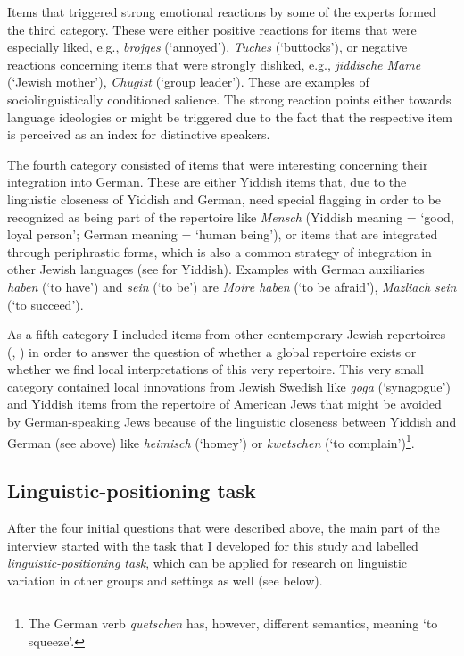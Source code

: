 \documentclass[output=paper]{langscibook}
\begin{document}
\begin{sloppypar}
Items that triggered strong emotional reactions by some of the experts formed the third category. These were either positive reactions for items that were especially liked, e.g., \textit{brojges} (‘annoyed’), \textit{Tuches} (‘buttocks’), or negative reactions concerning items that were strongly disliked, e.g., \textit{jiddische Mame} (‘Jewish mother’), \textit{Chugist} (‘group leader’). These are examples of sociolinguistically conditioned salience. The strong reaction points either towards language ideologies or might be triggered due to the fact that the respective item is perceived as an index for distinctive speakers.
\end{sloppypar}
The fourth category consisted of items that were interesting concerning their integration into German. These are either Yiddish items that, due to the linguistic closeness of Yiddish and German, need special flagging in order to be recognized as being part of the repertoire like \textit{Mensch} (Yiddish meaning = ‘good, loyal person’; German meaning = ‘human being’), or items that are integrated through periphrastic forms, which is also a common strategy of integration in other Jewish languages (see \citealt[210--212]{Jacobs2005} for Yiddish). Examples with German auxiliaries \textit{haben} (‘to have’) and \textit{sein} (‘to be’) are \textit{Moire haben} (‘to be afraid’), \textit{Mazliach sein} (‘to succeed’).

As a fifth category I included items from other contemporary Jewish repertoires (\citealt{KlagsbrunLebenswerd2016}, \citealt{BuninBenorCohen2011}) in order to answer the question of whether a global repertoire exists or whether we find local interpretations of this very repertoire. This very small category contained local innovations from Jewish Swedish like \textit{goga} (‘synagogue’) and Yiddish items from the repertoire of American Jews that might be avoided by German-speaking Jews because of the linguistic closeness between Yiddish and German (see above) like \textit{heimisch} (‘homey’) or \textit{kwetschen} (‘to complain’)\footnote{The German verb \textit{quetschen} has, however, different semantics, meaning `to squeeze'.}.

\subsection{Linguistic-positioning task}

After the four initial questions that were described above, the main part of the interview started with the task that I developed for this study and labelled \textit{linguistic-positioning task}, which can be applied for research on linguistic variation in other groups and settings as well (see below).
\end{document}
